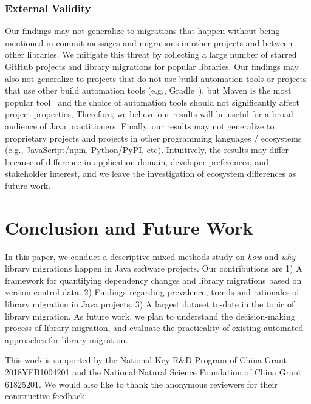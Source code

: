 \documentclass[sigconf, screen]{acmart}
\begin{document}
\subsubsection{External Validity}
Our findings may not generalize to migrations that happen without being mentioned in commit messages and migrations in other projects and between other libraries.
We mitigate this threat by collecting a large number of starred GitHub projects and library migrations for popular libraries.
Our findings may also not generalize to projects that do not use build automation tools or projects that use other build automation tools (e.g., Gradle~\cite{gradle}), but Maven is the most popular tool~\cite{jvm-ecosystem-report} and the choice of automation tools should not significantly affect project properties,
Therefore, we believe our results will be useful for a broad audience of Java practitioners.
Finally, our results may not generalize to proprietary projects and projects in other programming languages / ecosystems (e.g., JavaScript/npm, Python/PyPI, etc). 
Intuitively, the results may differ because of difference in application domain, developer preferences, and stakeholder interest, and we leave the investigation of ecosystem differences as future work.

\section{Conclusion and Future Work}

In this paper, we conduct a descriptive mixed methods study on \textit{how} and \textit{why} library migrations happen in Java software projects. %
Our contributions are %
1) A framework for quantifying dependency changes and library migrations based on version control data.
2) Findings regarding prevalence, trends and rationales of library migration in Java projects.
3) A largest dataset to-date in the topic of library migration.
As future work, we plan to understand the decision-making process of library migration, and evaluate the practicality of existing automated approaches for library migration.

\begin{acks}
This work is supported by the National Key R\&D Program of China Grant 2018YFB1004201 and the National Natural Science Foundation of China Grant 61825201. 
We would also like to thank the anonymous reviewers for their constructive feedback.
\end{acks}



\balance
\end{document}
